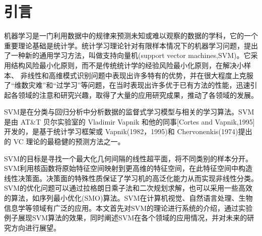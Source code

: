 

\chapter{\hei \textbf{引言}}

机器学习是一门利用数据中的规律来预测未知或难以观察的数据的学科，它的一个重要理论基础是统计学。统计学习理论\cite{张学工2000关于统计学习理论与支持向量机}针对有限样本情况下的机器学习问题，提出了一种新的通用学习方法，叫做支持向量机(support vector machines,SVM)。它采用结构风险最小化原则，而不是传统统计学的经验风险最小化原则\cite{cortes1995support,祁亨年2004支持向量机及其应用研究综述}，在解决小样本、 非线性和高维模式识别问题中表现出许多特有的优势，并在很大程度上克服了“维数灾难”和“过学习”等问题，在当时表现出许多优于已有方法的性能，迅速引起各领域的注意和研究兴趣，取得了大量的应用研究成果，推动了各领域的发展。

SVM是在分类与回归分析中分析数据的监督式学习模型与相关的学习算法。SVM是由 AT\&T 贝尔实验室的 Vladimir Vapnik 和他的同事[Cortes and Vapnik,1995\cite{cortes1995support}]开发的，是基于统计学习框架或 Vapnik(1982，1995)和 Chervonenkis(1974)提出的 VC 理论\cite{blumer1989learnability}的最稳健的预测方法之一。

SVM的目标是寻找一个最大化几何间隔的线性超平面，将不同类别的样本分开。SVM利用核函数将原始特征空间映射到更高维的特征空间，在此特征空间中构造线性决策面。决策面的特殊性质保证了学习机的高泛化能力从而实现非线性分类\cite{cortes1995support}。SVM的优化问题可以通过拉格朗日乘子法和二次规划求解，也可以采用一些高效的算法，如序列最小优化(SMO)算法。SVM在计算机视觉、自然语言处理、生物信息学等领域\cite{顾亚祥2011支持向量机研究进展}有广泛的应用\cite{张松兰2016支持向量机的算法及应用综述}。本文首先对SVM的理论进行系统的介绍，通过实验例子展现SVM算法的效果，同时阐述SVM在各个领域的应用情况，并对未来的研究方向进行展望。




